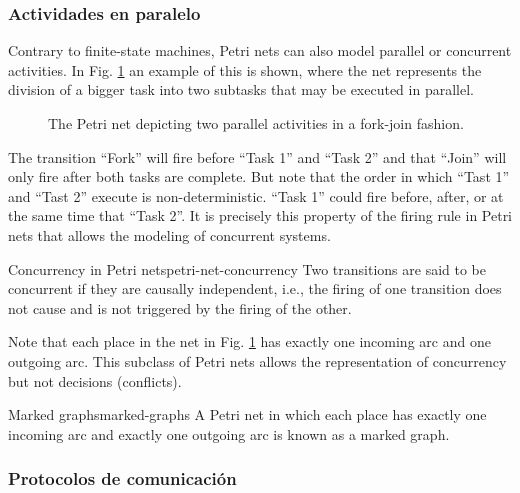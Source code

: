 \subsubsection{Actividades en paralelo}

Contrary to finite-state machines, Petri nets can also model parallel or concurrent activities.
In Fig. \ref{fig:parallel-activities-example} an example of this is shown,
where the net represents the division of a bigger task
into two subtasks that may be executed in parallel.

\begin{figure}[!htb]
      \centering
      
      \caption{The Petri net depicting two parallel activities in a fork-join fashion.}
      \label{fig:parallel-activities-example}
\end{figure}

The transition ``Fork'' will fire before ``Task 1'' and ``Task 2''
and that ``Join'' will only fire after both tasks are complete.
But note that the order in which ``Tast 1'' and ``Tast 2'' execute is non-deterministic.
``Task 1'' could fire before, after, or at the same time that ``Task 2''.
It is precisely this property of the firing rule in Petri nets
that allows the modeling of concurrent systems.

\begin{definition}{Concurrency in Petri nets}{petri-net-concurrency}
      Two transitions are said to be concurrent if they are causally independent, i.e.,
      the firing of one transition does not cause and is not triggered by the firing of the other.
\end{definition}

Note that each place in the net in Fig. \ref{fig:parallel-activities-example}
has exactly one incoming arc and one outgoing arc.
This subclass of Petri nets allows the representation of concurrency but not decisions (conflicts).

\begin{definition}{Marked graphs}{marked-graphs}
      A Petri net in which each place has exactly one incoming arc
      and exactly one outgoing arc is known as a marked graph.
\end{definition}

\subsubsection{Protocolos de comunicación}

